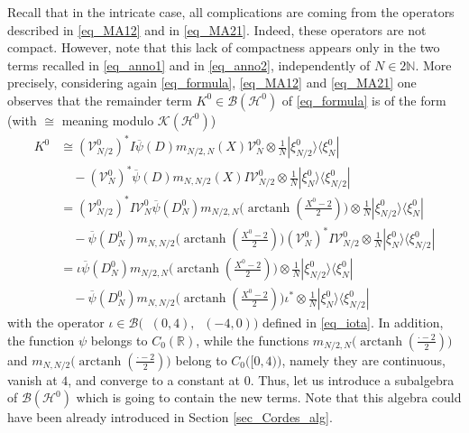 \documentclass[11pt]{article}
\def\B{\mathscr B}
\def\Hrond{\mathscr H}
\def\K{\mathscr K}
\def\N{\mathbb N}
\def\R{\mathbb R}
\def\V{\mathcal V}
\def\ltwo{\mathop{\mathrm{L}^2}\nolimits}
\def\arctanh{\mathop{\mathrm{arctanh}}\nolimits}
\begin{document}
Recall that in the intricate case, all complications are coming from the operators described  in \eqref{eq_MA12} and in \eqref{eq_MA21}. Indeed, these operators 
are not compact. However, note that this lack of compactness appears only in the two terms recalled in \eqref{eq_anno1} and in \eqref{eq_anno2}, independently of 
$N\in 2\N$.
More precisely, considering again \eqref{eq_formula}, \eqref{eq_MA12} and  \eqref{eq_MA21} one observes that the remainder term
$K^0\in \B(\Hrond^0)$ of \eqref{eq_formula} is of the form (with $\cong$ meaning
modulo $\K(\Hrond^0)$)
\begin{align*}
K^0 & \cong  (\V_{N/2}^0)^*  I\overline{\psi}(D) m_{N/2,N}(X) \V_N^0  
\otimes \tfrac{1}{N}|\xi^0_{N/2}\rangle \langle \xi^0_N| \\
& \quad -  (\V_N^0)^*\overline{\psi}(D) m_{N,N/2}(X) I \V_{N/2}^0 
\otimes \tfrac{1}{N}|\xi^0_{N}\rangle \langle \xi^0_{N/2}|  \\
& =  (\V_{N/2}^0)^*  I  \V_N^0\overline{\psi}(D^0_N) m_{N/2,N}\big(\arctanh(\tfrac{X^0-2}{2})\big) \otimes \tfrac{1}{N}|\xi^0_{N/2}\rangle \langle \xi^0_N| \\ 
& \quad - \overline{\psi}(D^0_N) m_{N,N/2}\big(\arctanh(\tfrac{X^0-2}{2})\big) (\V_N^0)^* I \V_{N/2}^0 \otimes \tfrac{1}{N}|\xi^0_{N}\rangle \langle \xi^0_{N/2}|  \\
& =  \iota \overline{\psi}(D^0_N) m_{N/2,N}\big(\arctanh(\tfrac{X^0-2}{2})\big) 
\otimes \tfrac{1}{N}|\xi^0_{N/2}\rangle \langle \xi^0_N|  \\
& \quad - \overline{\psi}(D^0_N) m_{N,N/2}\big(\arctanh(\tfrac{X^0-2}{2})\big) \iota^* 
\otimes \tfrac{1}{N}|\xi^0_{N}\rangle \langle \xi^0_{N/2}|
\end{align*}
with the operator $\iota\in \B\big(\ltwo(0,4),\ltwo(-4,0)\big)$ defined in \eqref{eq_iota}. In addition, the function $\psi$ belongs to $C_0(\R)$, while the functions
$ m_{N/2,N}\big(\arctanh(\tfrac{\cdot-2}{2})\big) $ and  $m_{N,N/2}\big(\arctanh(\tfrac{\cdot-2}{2})\big) $ belong to $C_0\big([0,4)\big)$,
namely they are continuous, vanish at $4$, and converge to a constant at $0$. 
Thus, let us introduce a subalgebra of $\B(\Hrond^0)$ which is going to contain
the new terms. Note that this algebra could have been already introduced  
in Section \ref{sec_Cordes_alg}.
\end{document}
